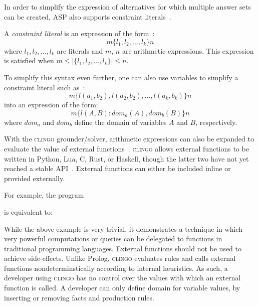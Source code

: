 In order to simplify the expression of alternatives for which multiple answer sets can be created, ASP also supports constraint literals~\citep{balduccini_asp_2011}.

\begin{definition}
    A \textit{constraint literal} is an expression of the form~\citep{balduccini_asp_2011}:
    \begin{equation}
        m\{l_1,l_2, \dots, l_k\}n
    \end{equation}
    where $ l_1,l_2, \dots, l_k $ are literals and $m$, $n$ are arithmetic expressions.
    This expression is satisfied when $m \le |\{ l_1,l_2, \dots, l_k\}| \le n$.

    To simplify this syntax even further, one can also use variables to simplify a constraint literal such as~\citep{balduccini_asp_2011}:
    \begin{equation}
        m\{l(a_1, b_2),l(a_2,b_2), \dots, l(a_k, b_k)\}n
    \end{equation}
    into an expression of the form:
    \begin{equation}
        m\{l(A, B) : dom_a(A), dom_b(B)\}n
    \end{equation}
    where $dom_a$ and $dom_b$ define the domain of variables $A$ and $B$, respectively.
\end{definition}

With the \textsc{clingo} grounder/solver\footnotemark, arithmetic expressions can also be expanded to evaluate the value of external functions~\citep{gebser_potassco_2019}.
\textsc{clingo} allows external functions to be written in Python, Lua, C, Rust, or Haskell, though the latter two have not yet reached a stable API~\citep{roland_kaminski_potasscoclingo_2020,sven_thiele_potasscoclingo-rs_2020,paul_ogris_tsahytclingo-haskell_2020}.
External functions can either be included inline or provided externally\footnotemark.

For example, the program

is equivalent to:


While the above example is very trivial, it demonstrates a technique in which very powerful computations or queries can be delegated to functions in traditional programming languages.
External functions should not be used to achieve side-effects.
Unlike Prolog, \textsc{clingo} evaluates rules and calls external functions nondeterminstically according to internal heuristics.
As such, a developer using \textsc{clingo} has no control over the values with which an external function is called.
A developer can only define domain for variable values, by inserting or removing facts and production rules.

